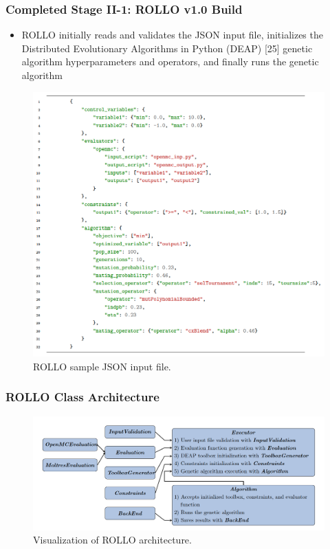 \begin{frame}
    \frametitle{Completed Stage II-1: ROLLO v1.0 Build}
    \begin{itemize}
        \item ROLLO initially reads and validates the JSON input file, initializes 
        the Distributed Evolutionary Algorithms in Python (DEAP) [25] genetic algorithm 
        hyperparameters and operators, and finally runs the genetic algorithm
    \end{itemize}
    \begin{figure}
        \begin{minipage}[c]{0.7\textwidth}
            \centering
        \includegraphics[width=0.7\linewidth]{figures/rollo-json-input.png} 
        \end{minipage}\hfill
        \begin{minipage}[c]{0.3\textwidth}
        \caption{ROLLO sample JSON input file.}
        \end{minipage}
    \end{figure}
\end{frame}

\begin{frame}
    \frametitle{ROLLO Class Architecture}
    \begin{figure}
        \centering
        \includegraphics[width=\linewidth]{figures/rollo-architecture.png} 
        \caption{Visualization of ROLLO architecture.}
    \end{figure}
\end{frame}